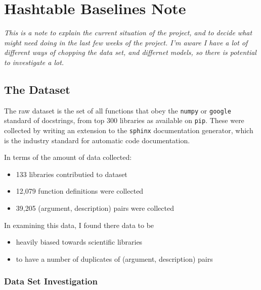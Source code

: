 \chapter{Hashtable Baselines Note}
\label{baselines_note}

\textit{This is a note to explain the current situation of the project, and to decide what might need doing in the last few weeks of the project. 
I'm aware I have a lot of different ways of chopping the data set, and differnet models, so there is potential to investigate a lot.}

\section{The Dataset} %
\label{sec:the_dataset}

The raw dataset is the set of all functions that obey the \texttt{numpy} or \texttt{google} standard of docstrings, from top 300 libraries as available on \texttt{pip}. 
These were collected by writing an extension to the \texttt{sphinx} documentation generator, which is the industry standard for automatic code documentation.

In terms of the amount of data collected:
\begin{itemize}
    \item 133 libraries contributied to dataset
    \item 12,079 function definitions were collected
    \item 39,205 (argument, description) pairs were collected
\end{itemize}

In examining this data, I found there data to be 
\begin{itemize}
    \item heavily biased towards scientific libraries
    \item to have a number of duplicates of (argument, description) pairs
\end{itemize}

\subsection{Data Set Investigation} %
\label{ssub:datasetinvestigation}









